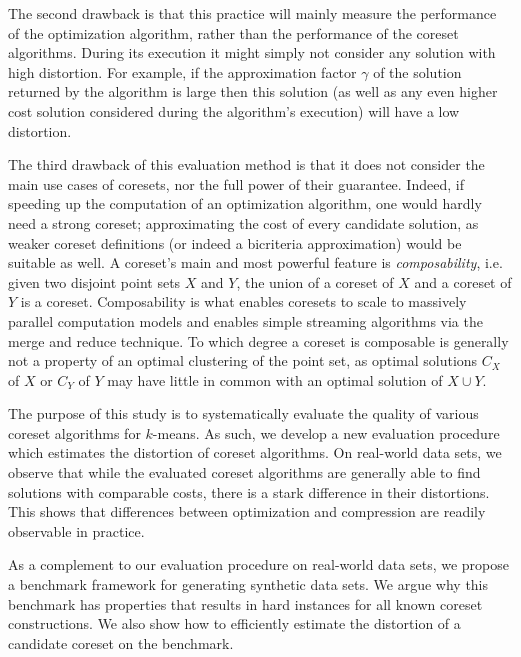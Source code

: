 The second drawback is that this practice will mainly measure the performance of the optimization algorithm, rather than the performance of the coreset algorithms. During its execution it might simply not consider any solution with high distortion. For example, if the approximation factor $\gamma$ of the solution returned by the algorithm is large then this solution (as well as any even higher cost solution considered during the algorithm’s execution) will have a low distortion. 

The third drawback of this evaluation method is that it does not consider the main use cases of coresets, nor the full power of their guarantee. Indeed, if speeding up the computation of an optimization algorithm, one would hardly need a strong coreset; approximating the cost of every candidate solution, as weaker coreset definitions (or indeed a bicriteria approximation) would be suitable as well. A coreset's main and most powerful feature is \emph{composability}, i.e. given two disjoint point sets $X$ and $Y$, the union of a coreset of $X$ and a coreset of $Y$ is a coreset. Composability is what enables coresets to scale to massively parallel computation models and enables simple streaming algorithms via the merge and reduce technique. To which degree a coreset is composable is generally not a property of an optimal clustering of the point set, as optimal solutions $C_X$ of $X$ or $C_Y$ of $Y$ may have little in common with an optimal solution of $X\cup Y$. 


The purpose of this study is to systematically evaluate the quality of various coreset algorithms for $k$-means. As such, we develop a new evaluation procedure which estimates the distortion of coreset algorithms. On real-world data sets, we observe that while the evaluated coreset algorithms are generally able to find solutions with comparable costs, there is a stark difference in their distortions. This shows that differences between optimization and compression are readily observable in practice.

As a complement to our evaluation procedure on real-world data sets, we propose a benchmark framework for generating synthetic data sets. We argue why this benchmark has properties that results in hard instances for all known coreset constructions. We also show how to efficiently estimate the distortion of a candidate coreset on the benchmark.


